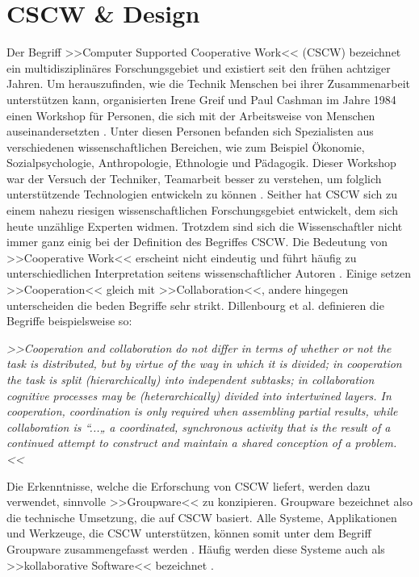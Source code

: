 \chapter{CSCW \& Design}\label{ch:CSCWDesign}

	Der Begriff >>Computer Supported Cooperative Work<< (CSCW) bezeichnet ein multidisziplinäres Forschungsgebiet und existiert seit den frühen achtziger Jahren. Um herauszufinden, wie die Technik Menschen bei ihrer Zusammenarbeit unterstützen kann, organisierten Irene Greif und Paul Cashman im Jahre 1984 einen Workshop für Personen, die sich mit der Arbeitsweise von Menschen auseinandersetzten \citep{Grudin:1994}. Unter diesen Personen befanden sich Spezialisten aus verschiedenen wissenschaftlichen Bereichen, wie zum Beispiel Ökonomie, Sozialpsychologie, Anthropologie, Ethnologie und Pädagogik. Dieser Workshop war der Versuch der Techniker, Teamarbeit besser zu verstehen, um folglich unterstützende Technologien entwickeln zu können \citep{Grudin:1994, Rama:2006p245}. Seither hat CSCW sich zu einem nahezu riesigen wissenschaftlichen Forschungsgebiet entwickelt, dem sich heute unzählige Experten widmen. Trotzdem sind sich die Wissenschaftler nicht immer ganz einig bei der Definition des Begriffes CSCW. Die Bedeutung von >>Cooperative Work<< erscheint nicht eindeutig und führt häufig zu unterschiedlichen Interpretation seitens wissenschaftlicher Autoren \citep{Gerlicher:2007p241}. Einige setzen >>Cooperation<< gleich mit >>Collaboration<<, andere hingegen unterscheiden die beden Begriffe sehr strikt. Dillenbourg et al. definieren die Begriffe beispielsweise so: 
	
	\bigskip\emph{>>Cooperation and collaboration do not differ in terms of whether or not the task is distributed, but by virtue of the way in which it is divided; in cooperation the task is split (hierarchically) into independent subtasks; in collaboration cognitive processes may be (heterarchically) divided into intertwined layers. In cooperation, coordination is only required when assembling partial results, while collaboration is “...„ a coordinated, synchronous activity that is the result of a continued attempt to construct and maintain a shared conception of a problem.<<} \citep{Dillenbourg:1995}
	
	\bigskip Die Erkenntnisse, welche die Erforschung von CSCW liefert, werden dazu verwendet, sinnvolle >>Groupware<< zu konzipieren. Groupware bezeichnet also die technische Umsetzung, die auf CSCW basiert. Alle Systeme, Applikationen und Werkzeuge, die CSCW unterstützen, können somit unter dem Begriff Groupware zusammengefasst werden \citep{Koch2008, Gerlicher:2007p241}. Häufig werden diese Systeme auch als >>kollaborative Software<< bezeichnet \citep{Bannon:1990p244}. 
	
